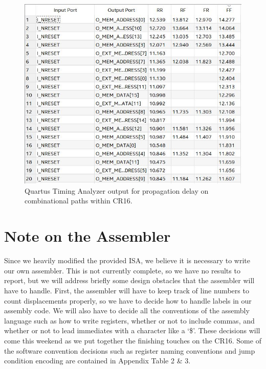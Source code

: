 \documentclass[conference]{IEEEtran}
\begin{document}
\begin{figure}[t]
    \centering
    \includegraphics[scale=0.65]{resources/figures/prop_delay_cr16.jpg}
    \caption{Quartus Timing Analyzer output for propagation delay on combinational paths within CR16.}
    \label{fig:prop_delay}
\end{figure}

\section{Note on the Assembler}
Since we heavily modified the provided ISA, we believe it is necessary to write our own assembler. This is not currently complete, so we have no results to report, but we will address briefly some design obstacles that the assembler will have to handle. First, the assembler will have to keep track of line numbers to count displacements properly, so we have to decide how to handle labels in our assembly code. We will also have to decide all the conventions of the assembly language such as how to write registers, whether or not to include commas, and whether or not to lead immediates with a character like a `\$'. These decisions will come this weekend as we put together the finishing touches on the CR16. Some of the software convention decisions such as register naming conventions and jump condition encoding are contained in Appendix Table 2 \& 3.
\end{document}
